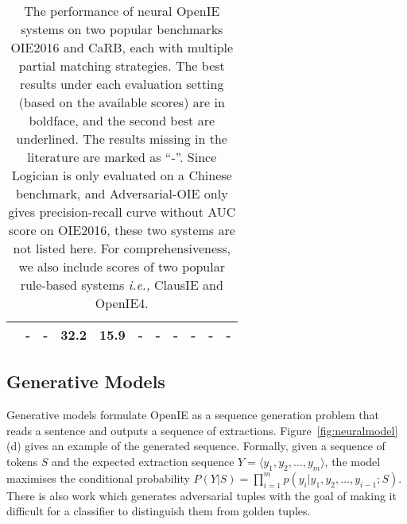 \documentclass{article}
\newcommand{\ie}{\emph{i.e.,}\xspace}
\begin{document}
\begin{table*}[th]
\begin{tabular}{l | c c | c c |c c | c c| c c}
    \cite{tang-etal-2020-syntactic} & - & - & \textbf{32.2} & \textbf{15.9} & - & - & - & - & - & - \\
    \bottomrule
  \end{tabular}
  \caption{The performance of neural OpenIE systems on two popular benchmarks OIE2016 and CaRB, each with multiple partial matching strategies. The best results under each evaluation setting (based on the available scores) are in boldface, and the second best are underlined. The results missing in the literature are marked as ``-''. Since Logician is only evaluated on a Chinese benchmark, and Adversarial-OIE only gives precision-recall curve without AUC score on OIE2016, these two systems are not listed here. For comprehensiveness, we also include scores of two popular rule-based systems \ie ClausIE and OpenIE4.}
  \label{tab:eval}
  \vspace{-1em}
\end{table*}

\subsection{Generative Models}
Generative models formulate OpenIE as a sequence generation problem that reads a sentence and outputs a sequence of extractions.
Figure~\ref{fig:neuralmodel}(d) gives an example of the generated sequence.
Formally, given a sequence of tokens \(S\) and the expected extraction sequence \(Y = \langle y_1, y_2, \ldots, y_m \rangle\), the model maximises the conditional probability \(P(Y|S)=\prod_{i=1}^{m}{p(y_i|y_1, y_2, \ldots, y_{i-1};S)}\). There is also work which generates adversarial tuples with the goal of making it difficult for a classifier to distinguish them from  golden tuples.
\end{document}
